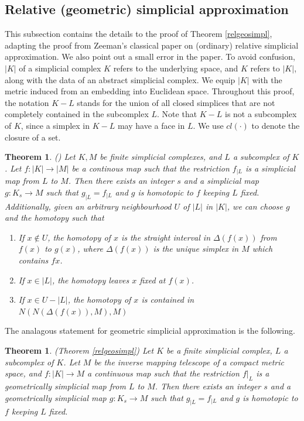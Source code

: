 \documentclass[a4paper,11pt]{article}
\theoremstyle{definition}
\theoremstyle{plain}
\newtheorem{theorem}[definition]{Theorem}
\newtheorem*{theorem*}{Theorem}
\theoremstyle{remark}
\begin{document}
{\subsection{Relative (geometric) simplicial approximation}\label{relgeosimplsect}

This subsection contains the details to the proof of Theorem \ref{relgeosimpl}, adapting the proof from Zeeman's classical paper  \cite{zeeman1964relative} on (ordinary) relative simplicial approximation. We also point out a small error in the paper. To avoid confusion, $|K|$ of a simplicial complex $K$ refers to the underlying space, and $K$ refers to $|K|$, along with the data of an abstract simplicial complex. We equip $|K|$ with the metric induced from an embedding into Euclidean space. Throughout this proof, the notation $K-L$ stands for the union of all closed simplices that are not completely contained in the subcomplex $L$. Note that $K-L$ is not a subcomplex of $K$, since a simplex in $K-L$ may have a face in $L$. We use $cl(\cdot)$ to denote the closure of a set. 

\begin{theorem} (\cite{zeeman1964relative}) \label{relordinarysa} Let $K,M$ be finite simplicial complexes, and $L$ a subcomplex of $K$. Let $f: |K|\rightarrow |M|$ be a continous map such that the restriction $f_{|L}$ is a simplicial map from $L$ to $M$. Then there exists an integer $s$ and a simplicial map $g: K_{s}\rightarrow M$ such that $g_{|L}=f_{|L}$ and $g$ is homotopic to $f$ keeping $L$ fixed. \\

Additionally, given an arbitrary neighbourhood $U$ of $|L|$ in $|K|$, we can choose $g$ and the homotopy such that
\begin{enumerate}
\item If $x\notin U$, the homotopy of $x$ is the straight interval in $\Delta(f(x))$ from $f(x)$ to $g(x)$, where $\Delta(f(x))$ is the unique simplex in $M$ which contains $fx$. 
\item If $x\in |L|$, the homotopy leaves $x$ fixed at $f(x)$.
\item If $x\in U - |L|$, the homotopy of $x$ is contained in $N(N(\Delta(f(x)), M), M)$
\end{enumerate}
\end{theorem}

The analagous statement for geometric simplicial approximation is the following. 

\begin{theorem*} (Theorem \ref{relgeosimpl}) Let $K$ be a finite simplicial complex, $L$ a subcomplex of $K$. Let $M$ be the inverse mapping telescope of a compact metric space, and $f: |K|\rightarrow M$ a continuous map such that the restriction $f|_{L}$ is a geometrically simplicial map from $L$ to $M$. Then there exists an integer $s$ and a geometrically simplicial map $g: K_{s}\rightarrow M$ such that $g_{|L} = f_{|L}$ and $g$ is homotopic to $f$ keeping $L$ fixed.\\


\end{theorem*}}
\end{document}
